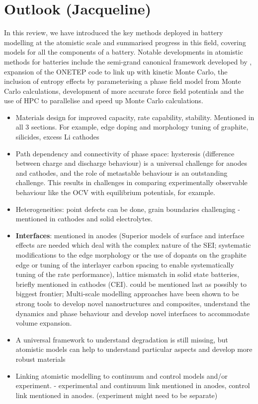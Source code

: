 \documentclass[../main.tex]{subfiles}
\begin{document}
\section{Outlook (Jacqueline)}
In this review, we have introduced the key methods deployed in battery modelling at the atomistic scale and summarised progress in this field, covering models for all the components of a battery. Notable developments in atomistic methods for batteries include the semi-grand canonical framework developed by \citeauthor{VanderVen2020}, expansion of the ONETEP code to link up with kinetic Monte Carlo, the inclusion of entropy effects by parameterising a phase field model from Monte Carlo calculations, development of more accurate force field potentials and the use of HPC to parallelise and speed up Monte Carlo calculations.


\begin{itemize}

    \item Materials design for improved capacity, rate capability, stability. Mentioned in all 3 sections. For example, edge doping and morphology tuning of graphite, silicides, excess Li cathodes
    
    \item Path dependency and connectivity of phase space: hysteresis (difference between charge and discharge behaviour) is a universal challenge for anodes and cathodes, and the role of metastable behaviour is an outstanding challenge. This results in challenges in comparing experimentally observable behaviour like the OCV with equilibrium potentials, for example.
    
    \item Heterogeneities: point defects can be done, grain boundaries challenging - mentioned in cathodes and solid electrolytes.
    
    \item \textbf{Interfaces}: mentioned in anodes (Superior models of surface and interface effects are needed which deal with the complex nature of the SEI; systematic modifications to the edge morphology or the use of dopants on the graphite edge \cite{peng2020lithium,weydanz1994behavior,way1994effect} or tuning of the interlayer carbon spacing \cite{JI201866} to enable systematically tuning of the rate performance), lattice mismatch in solid state batteries, briefly mentioned in cathodes (CEI). could be mentioned last as possibly to biggest frontier; Multi-scale modelling approaches have been shown to be strong tools to develop novel nanostructures and composites, understand the dynamics and phase behaviour and develop novel interfaces to accommodate volume expansion.
    
    \item A universal framework to understand degradation is still missing, but atomistic models can help to understand particular aspects and develop more robust materials
    
    \item Linking atomistic modelling to continuum and control models and/or experiment. - experimental and continuum link mentioned in anodes, control link mentioned in anodes. (experiment might need to be separate)

\end{itemize}
\end{document}
